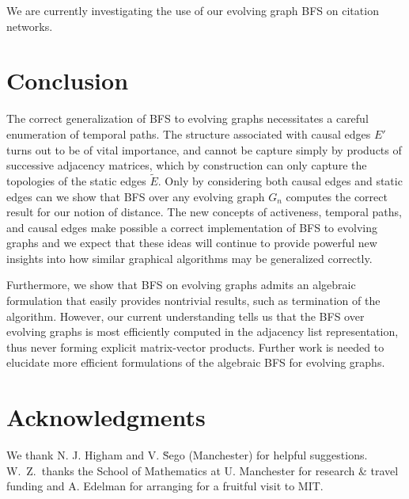 \documentclass[10pt,conference,compsocconf]{IEEEtran}
\theoremstyle{definition}
\begin{document}
We are currently investigating the use of our evolving graph BFS on citation
networks.


\section{Conclusion}

The correct generalization of BFS to evolving graphs necessitates a careful
enumeration of temporal paths. The structure associated with causal edges $E'$
turns out to be of vital importance, and cannot be capture simply by products of
successive adjacency matrices, which by construction can only capture the
topologies of the static edges $\tilde E$. Only by considering both causal edges
and static edges can we show that BFS over any evolving graph $G_n$ computes the
correct result for our notion of distance.
The new concepts of activeness, temporal paths, and causal edges make possible a
correct implementation of BFS to evolving graphs and we expect that these
ideas will continue to provide powerful new insights into how similar graphical
algorithms may be generalized correctly.

Furthermore, we show that BFS on evolving graphs admits an algebraic formulation
that easily provides nontrivial results, such as termination of the algorithm.
However, our current understanding tells us that the BFS over evolving graphs
is most efficiently computed in the adjacency list representation, thus never
forming explicit matrix-vector products. Further work is needed to elucidate
more efficient formulations of the algebraic BFS for evolving graphs.


\section*{Acknowledgments}

We thank N. J. Higham and V. \u Sego (Manchester) for helpful suggestions.
W.\ Z.\ thanks the School of Mathematics at U. Manchester for research \& travel funding and
A. Edelman for arranging for a fruitful visit to MIT.
\end{document}

